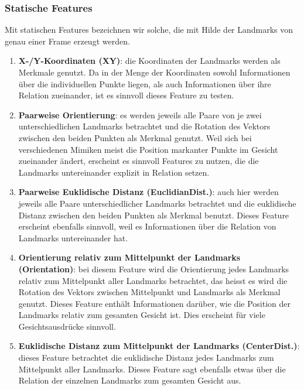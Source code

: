\subsubsection{Statische Features}
Mit statischen Features bezeichnen wir solche, die mit Hilde der Landmarks von genau einer Frame erzeugt werden.
\begin{enumerate}
  \item \textbf{X-/Y-Koordinaten (XY)}: die Koordinaten der Landmarks werden als Merkmale genutzt. Da in der Menge der Koordinaten sowohl Informationen
        über die individuellen Punkte liegen, als auch Informationen über ihre Relation zueinander, ist es sinnvoll dieses Feature zu testen.

    \item \textbf{Paarweise Orientierung}: es werden jeweils alle Paare von je zwei unterschiedlichen Landmarks betrachtet und die Rotation des Vektors zwischen
        den beiden Punkten als Merkmal genutzt. Weil sich bei verschiedenen Mimiken meist die Position markanter Punkte im Gesicht zueinander ändert, erscheint es sinnvoll
        Features zu nutzen, die die Landmarks untereinander explizit in Relation setzen.

      \item \textbf{Paarweise Euklidische Distanz (EuclidianDist.)}: auch hier werden jeweils alle Paare unterschiedlicher Landmarks betrachtet und die euklidische Distanz zwischen
        den beiden Punkten als Merkmal benutzt. Dieses Feature erscheint ebenfalls sinnvoll, weil es Informationen über die Relation von Landmarks untereinander hat.

      \item \textbf{Orientierung relativ zum Mittelpunkt der Landmarks (Orientation)}: bei diesem Feature wird die Orientierung jedes Landmarks relativ zum Mittelpunkt aller Landmarks betrachtet,
        das heisst es wird die Rotation des Vektors zwischen Mittelpunkt und Landmarks als Merkmal genutzt. Dieses Feature enthält Informationen darüber, wie die Position der Landmarks relativ
        zum gesamten Gesicht ist. Dies erscheint für viele Gesichtsausdrücke sinnvoll.

      \item \textbf{Euklidische Distanz zum Mittelpunkt der Landmarks (CenterDist.)}: dieses Feature betrachtet die euklidische Distanz jedes Landmarks zum Mittelpunkt aller Landmarks. Dieses Feature sagt ebenfalls
        etwas über die Relation der einzelnen Landmarks zum gesamten Gesicht aus.


\end{enumerate}
